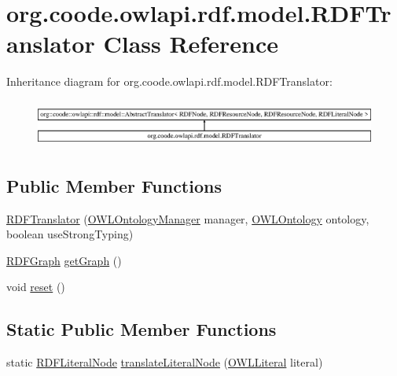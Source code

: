 \hypertarget{classorg_1_1coode_1_1owlapi_1_1rdf_1_1model_1_1_r_d_f_translator}{\section{org.\-coode.\-owlapi.\-rdf.\-model.\-R\-D\-F\-Translator Class Reference}
\label{classorg_1_1coode_1_1owlapi_1_1rdf_1_1model_1_1_r_d_f_translator}
}
Inheritance diagram for org.\-coode.\-owlapi.\-rdf.\-model.\-R\-D\-F\-Translator\-:\begin{figure}[H]
\begin{center}
\leavevmode
\includegraphics[height=1.584159cm]{classorg_1_1coode_1_1owlapi_1_1rdf_1_1model_1_1_r_d_f_translator}
\end{center}
\end{figure}
\subsection*{Public Member Functions}
\begin{DoxyCompactItemize}
\item 
\hyperlink{classorg_1_1coode_1_1owlapi_1_1rdf_1_1model_1_1_r_d_f_translator_aec624b514c0f025e554d71f96e386745}{R\-D\-F\-Translator} (\hyperlink{interfaceorg_1_1semanticweb_1_1owlapi_1_1model_1_1_o_w_l_ontology_manager}{O\-W\-L\-Ontology\-Manager} manager, \hyperlink{interfaceorg_1_1semanticweb_1_1owlapi_1_1model_1_1_o_w_l_ontology}{O\-W\-L\-Ontology} ontology, boolean use\-Strong\-Typing)
\item 
\hyperlink{classorg_1_1coode_1_1owlapi_1_1rdf_1_1model_1_1_r_d_f_graph}{R\-D\-F\-Graph} \hyperlink{classorg_1_1coode_1_1owlapi_1_1rdf_1_1model_1_1_r_d_f_translator_ab5d038055e5462bf0ec83ec355cca811}{get\-Graph} ()
\item 
void \hyperlink{classorg_1_1coode_1_1owlapi_1_1rdf_1_1model_1_1_r_d_f_translator_a00e5021a066503da120462c1d38a1a2b}{reset} ()
\end{DoxyCompactItemize}
\subsection*{Static Public Member Functions}
\begin{DoxyCompactItemize}
\item 
static \hyperlink{classorg_1_1coode_1_1owlapi_1_1rdf_1_1model_1_1_r_d_f_literal_node}{R\-D\-F\-Literal\-Node} \hyperlink{classorg_1_1coode_1_1owlapi_1_1rdf_1_1model_1_1_r_d_f_translator_a8fd432689b5fcfc81ebbe4a8683ad6f8}{translate\-Literal\-Node} (\hyperlink{interfaceorg_1_1semanticweb_1_1owlapi_1_1model_1_1_o_w_l_literal}{O\-W\-L\-Literal} literal)
\end{DoxyCompactItemize}
